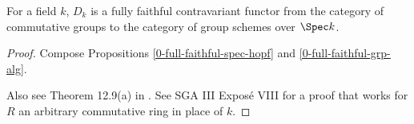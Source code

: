 \begin{theorem}
  \label{0-full-faithful-spec-grp-alg}
  \leanok

  For a field $k$, $D_k$ is a fully faithful contravariant functor from the category of commutative groups to the category of group schemes over $\Spec k$.
\end{theorem}
\begin{proof}
  \leanok

  Compose Propositions \ref{0-full-faithful-spec-hopf} and \ref{0-full-faithful-grp-alg}.

  Also see Theorem 12.9(a) in \cite{Milne_2017}. See SGA III Exposé VIII for a proof that works for $R$ an arbitrary commutative ring in place of $k$.
\end{proof}

